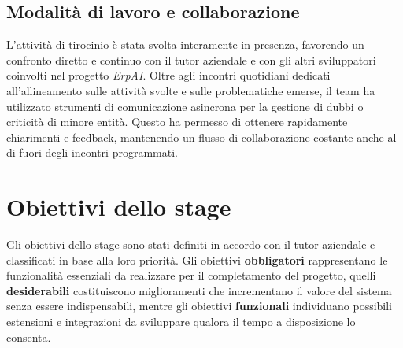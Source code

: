 \subsection{Modalità di lavoro e collaborazione}
L'attività di tirocinio è stata svolta interamente in presenza, favorendo un confronto diretto e continuo con il tutor aziendale e con gli altri sviluppatori coinvolti nel 
progetto \textit{ErpAI}.
\newline
Oltre agli incontri quotidiani dedicati all'allineamento sulle attività svolte e sulle problematiche emerse, il team ha utilizzato strumenti di comunicazione asincrona per 
la gestione di dubbi o criticità di minore entità. Questo ha permesso di ottenere rapidamente chiarimenti e feedback, mantenendo un flusso di collaborazione costante anche al 
di fuori degli incontri programmati.


\section{Obiettivi dello stage}
Gli obiettivi dello stage sono stati definiti in accordo con il tutor aziendale e classificati in base alla loro priorità. Gli obiettivi \textbf{obbligatori} 
rappresentano le funzionalità essenziali da realizzare per il completamento del progetto, quelli \textbf{desiderabili} costituiscono miglioramenti che incrementano il 
valore del sistema senza essere indispensabili, mentre gli obiettivi \textbf{funzionali} individuano possibili estensioni e integrazioni da sviluppare qualora il tempo a 
disposizione lo consenta.
\newpage

